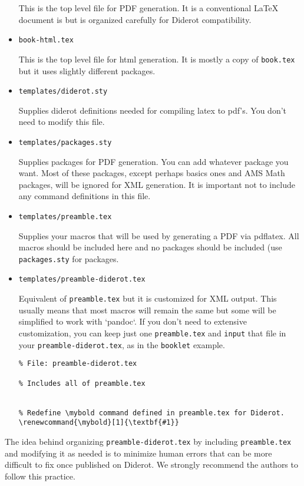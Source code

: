 \begin{note}
\begin{itemize}
This is the top level file for PDF generation.  It is a conventional LaTeX document is but is organized carefully for Diderot compatibility.

\item \lstinline`book-html.tex`

This is the top level file for html generation.  It is mostly a copy of \lstinline`book.tex` but it uses slightly different packages.

\item \lstinline`templates/diderot.sty`

Supplies diderot definitions needed for compiling latex to pdf's.
You don't need to modify this file.

\item \lstinline`templates/packages.sty`

Supplies packages for PDF generation.  You can add whatever package
you want.  Most of these packages, except perhaps basics ones and AMS
Math packages, will be ignored for XML generation.  It is important not to include any command definitions in this file.

\item \lstinline`templates/preamble.tex` 

Supplies your macros that will be used by generating a PDF via pdflatex.  All macros should be included here and no packages should be included (use \lstinline`packages.sty` for packages.  


\item \lstinline`templates/preamble-diderot.tex` 

Equivalent of \lstinline`preamble.tex` but it is customized for XML output.  This usually means that most macros will remain the same but some will be simplified to work with `pandoc`.  If you don't need to extensive customization, you can keep just one \lstinline`preamble.tex` and \lstinline`input` that file in your \lstinline`preamble-diderot.tex`, as in the \lstinline`booklet` example.
%
\begin{lstlisting}
% File: preamble-diderot.tex

% Includes all of preamble.tex


% Redefine \mybold command defined in preamble.tex for Diderot.
\renewcommand{\mybold}[1]{\textbf{#1}}
\end{lstlisting}
\end{itemize}    

\begin{important}
The idea behind organizing \lstinline`preamble-diderot.tex` by including \lstinline`preamble.tex` and modifying it as needed is to minimize human errors that can be more difficult to fix once published on Diderot. 
%
We strongly recommend the authors to follow this practice.
\end{important}




\end{note}
